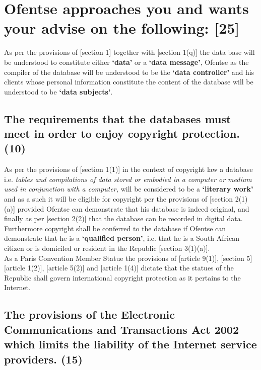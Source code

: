 \documentclass[11pt]{article}
\begin{document}
\section{Ofentse approaches you and wants your advise on the following: [25]}
\label{sec:org14a4c98}

As per the provisions of [section 1]\cite{rsa02_elect_comm_trans_act} together
with [section 1(q)]\cite{rsa12_elect_comm_trans_amend_bill} the data base will be
understood to constitute either \textbf{`data'} or a \textbf{`data message'}, Ofentse as
the compiler of the database will be understood to be the \textbf{`data controller'}
and his clients whose personal information constitute the content of the
database will be understood to be \textbf{`data subjects'}.

\subsection{The requirements that the databases must meet in order to enjoy copyright protection. (10)}
\label{sec:org690f045}

As per the provisions of [section 1(1)]\cite{rsa78_copyrightact} in the context of
copyright law a database i.e. \emph{tables and compilations of data stored or
embodied in a computer or medium used in conjunction with a computer,} will be
considered to be a \textbf{`literary work'} and as a such it will be eligible for
copyright per the provisions of [section 2(1)(a)]\cite{rsa78_copyrightact}
provided Ofentse can demonstrate that his database is indeed original, and
finally as per [section 2(2)]\cite{rsa78_copyrightact} that the database can be
recorded in digital data. Furthermore copyright shall be conferred to the
database if Ofentse can demonstrate that he is a \textbf{`qualified person'}, i.e. that
he is a South African citizen or is domiciled or resident in the Republic
[section 3(1)(a)]\cite{rsa78_copyrightact}. \\

As a Paris Convention Member Statue the provisions of [article
9(1)]\cite{wto17_trips}, [section 5]\cite{rsa78_copyrightact} [article
1(2)]\cite{eurlex00_elec_commerce}, [article 5(2)]\cite{wipo86_berne} and [article
1(4)]\cite{wipo96_copyright_treaty} dictate that the statues of the Republic shall
govern international copyright protection as it pertains to the Internet.

\subsection{The provisions of the Electronic Communications and Transactions Act 2002 which limits the liability of the Internet service providers. (15)}
\label{sec:orgf580b60}
\end{document}
